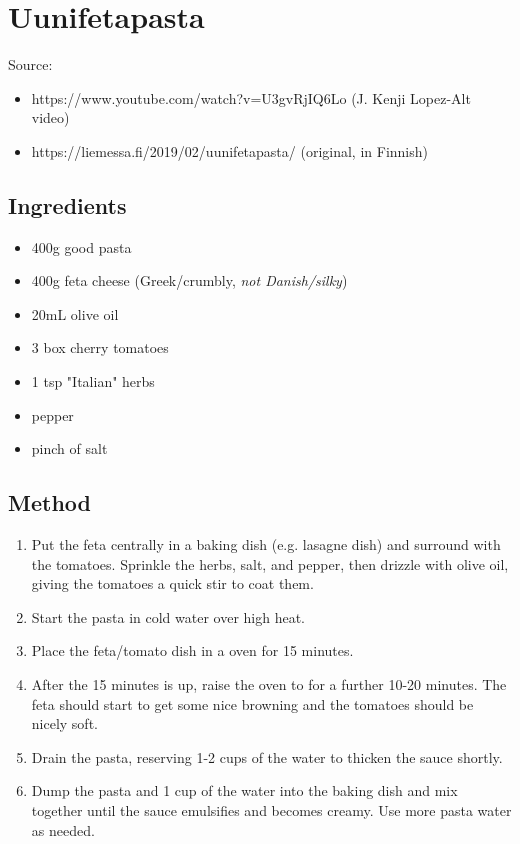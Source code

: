 \section{Uunifetapasta}

  
Source: 
\begin{itemize}
    \item https://www.youtube.com/watch?v=U3gvRjIQ6Lo (J. Kenji Lopez-Alt video)
    \item https://liemessa.fi/2019/02/uunifetapasta/ (original, in Finnish)
\end{itemize}

\subsection{Ingredients}

\begin{itemize}
    \item 400g good pasta
    \item 400g feta cheese (Greek/crumbly, \emph{not Danish/silky})
    \item 20mL olive oil
    \item 3 box cherry tomatoes
    \item 1 tsp "Italian" herbs
    \item pepper
    \item pinch of salt
\end{itemize}

\subsection{Method}

\begin{enumerate}
    \item Put the feta centrally in a baking dish (e.g. lasagne dish) and surround with the tomatoes. Sprinkle the herbs, salt, and pepper, then drizzle with olive oil, giving the tomatoes a quick stir to coat them.
    \item Start the pasta in cold water over high heat.
    \item Place the feta/tomato dish in a  oven for 15 minutes.
    \item After the 15 minutes is up, raise the oven to  for a further 10-20 minutes. The feta should start to get some nice browning and the tomatoes should be nicely soft.
    \item Drain the pasta, reserving 1-2 cups of the water to thicken the sauce shortly.
    \item Dump the pasta and 1 cup of the water into the baking dish and mix together until the sauce emulsifies and becomes creamy. Use more pasta water as needed.
\end{enumerate}
